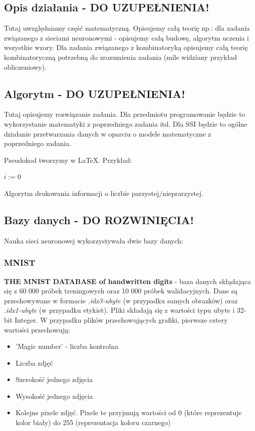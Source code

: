 \documentclass[12pt,a4paper]{article}
\begin{document}
	\subsection*{Opis działania - \textbf{DO UZUPEŁNIENIA!}} 
	Tutaj uwzględniamy część matematyczną. Opisujemy całą teorię np.:
	dla zadania związanego z sieciami neuronowymi - opisujemy całą budowę, algorytm uczenia i wszystkie wzory. Dla zadania związanego z kombinatoryką opisujemy całą teorię kombinatoryczną potrzebną do zrozumienia zadania (mile widziany przykład obliczeniowy).
	
	\subsection*{Algorytm - \textbf{DO UZUPEŁNIENIA!}}
	Tutaj opisujemy rozwiązanie zadania. Dla przedmiotu programowanie będzie to wykorzystanie matematyki z poprzedniego zadania itd. Dla SSI będzie to ogólne działanie przetwarzania danych w oparciu o modele matematyczne z poprzedniego zadania. 
	
	
	Pseudokod tworzymy w \LaTeX. Przykład:\\
	\begin{algorithm}[H]
		$i:=0$\;
		\caption{Algorytm drukowania informacji o liczbie parzystej/nieprarzystej.}
	\end{algorithm}

	\subsection*{Bazy danych - \textbf{DO ROZWINIĘCIA!}}
	Nauka sieci neuronowej wykorzystywała dwie bazy danych:
	\subsubsection*{MNIST}
	\textbf{THE MNIST DATABASE of handwritten digits} - baza danych skłądająca się z 60 000 próbek treningowych oraz 10 000 próbek walidacyjnych. Dane są przechowywane w formacie \textit{.idx3-ubyte} (w przypadku samych obrazków) oraz \textit{.idx1-ubyte} (w przypadku etykiet). Pliki składają się z wartości typu ubyte i 32-bit Integer. W przypadku plików przechowujących grafiki, pierwsze cztery wartości przechowują:
	\begin{itemize}
	\item 'Magic number' - liczba kontrolna
	\item Liczba zdjęć
	\item Szerokość jednego zdjęcia
	\item Wysokość jednego zdjęcia
	\item Kolejne pixele zdjęć. Pixele te przyjmują wartości od 0 (które reprezentuje kolor biały) do 255 (reprezentacja koloru czarnego)
	\end{itemize}
	
\end{document}
